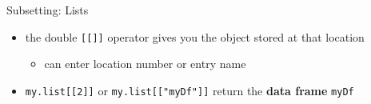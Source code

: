 \documentclass[
  ignorenonframetext,
]{beamer}
\newenvironment{Shaded}{\begin{snugshade}}{\end{snugshade}}
\newcommand{\DecValTok}[1]{\textcolor[rgb]{0.00,0.00,0.81}{#1}}
\newcommand{\ErrorTok}[1]{\textcolor[rgb]{0.64,0.00,0.00}{\textbf{#1}}}
\newcommand{\FunctionTok}[1]{\textcolor[rgb]{0.00,0.00,0.00}{#1}}
\newcommand{\NormalTok}[1]{#1}
\newcommand{\SpecialCharTok}[1]{\textcolor[rgb]{0.00,0.00,0.00}{#1}}
\newcommand{\StringTok}[1]{\textcolor[rgb]{0.31,0.60,0.02}{#1}}
\providecommand{\tightlist}{%
  \setlength{\itemsep}{0pt}\setlength{\parskip}{0pt}}
\begin{document}
\begin{frame}[fragile]{Subsetting: Lists}
\protect\hypertarget{subsetting-lists-2}{}
\begin{itemize}[<+->]
\tightlist
\item
  the double \texttt{{[}{[}{]}{]}} operator gives you the object stored
  at that location

  \begin{itemize}[<+->]
  \tightlist
  \item
    can enter location number or entry name
  \end{itemize}
\item
  \texttt{my.list{[}{[}2{]}{]}} or \texttt{my.list{[}{[}"myDf"{]}{]}}
  return the \textbf{data frame} \texttt{myDf}
\end{itemize}

\begin{Shaded}
\end{Shaded}
\end{frame}
\end{document}
